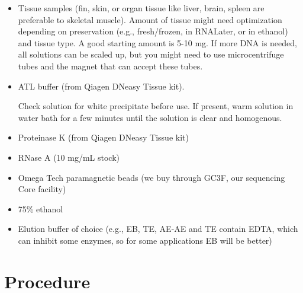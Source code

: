 \documentclass[
  letterpaper,
  DIV=11,
  numbers=noendperiod]{scrreprt}
\begin{document}
\begin{itemize}
\item
  Tissue samples (fin, skin, or organ tissue like liver, brain, spleen
  are preferable to skeletal muscle). Amount of tissue might need
  optimization depending on preservation (e.g., fresh/frozen, in
  RNALater, or in ethanol) and tissue type. A good starting amount is
  5-10 mg. If more DNA is needed, all solutions can be scaled up, but
  you might need to use microcentrifuge tubes and the magnet that can
  accept these tubes.
\item
  ATL buffer (from Qiagen DNeasy Tissue kit).

  \begin{tcolorbox}[enhanced jigsaw, rightrule=.15mm, title=\textcolor{quarto-callout-warning-color}{\faExclamationTriangle}\hspace{0.5em}{IMPORTANT}, titlerule=0mm, opacitybacktitle=0.6, toprule=.15mm, bottomrule=.15mm, opacityback=0, left=2mm, colframe=quarto-callout-warning-color-frame, breakable, coltitle=black, colback=white, colbacktitle=quarto-callout-warning-color!10!white, bottomtitle=1mm, leftrule=.75mm, toptitle=1mm, arc=.35mm]

  Check solution for white precipitate before use. If present, warm
  solution in water bath for a few minutes until the solution is clear
  and homogenous.

  \end{tcolorbox}
\item
  Proteinase K (from Qiagen DNeasy Tissue kit)
\item
  RNase A (10 mg/mL stock)
\item
  Omega Tech paramagnetic beads (we buy through GC3F, our sequencing
  Core facility)
\item
  75\% ethanol
\item
  Elution buffer of choice (e.g., EB, TE, AE-AE and TE contain EDTA,
  which can inhibit some enzymes, so for some applications EB will be
  better)
\end{itemize}

\hypertarget{procedure-20}{%
\section{Procedure}\label{procedure-20}}
\end{document}
